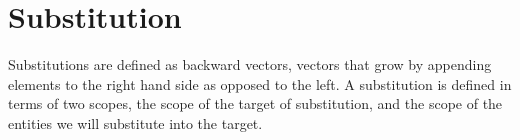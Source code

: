 \section{Substitution}




Substitutions are defined as backward vectors, vectors that grow by appending
elements to the right hand side as opposed to the left. A substitution is
defined in terms of two scopes, the scope of the target of substitution, and
the scope of the entities we will substitute into the target.

\begin{code}%
\>[0]\AgdaSpace{}%
\AgdaSymbol{:}\AgdaSpace{}%
\AgdaSpace{}%
\AgdaSpace{}%
\AgdaSpace{}%
\AgdaSpace{}%
\AgdaSpace{}%
\AgdaSpace{}%
\<%
\\
\>[0]\AgdaSpace{}%
\AgdaOperator{\AgdaFunction{⇒[}}\AgdaSpace{}%
\AgdaSpace{}%
\AgdaOperator{\AgdaFunction{]}}\AgdaSpace{}%
\AgdaSpace{}%
\AgdaSymbol{=}\AgdaSpace{}%
\AgdaSpace{}%
\AgdaSymbol{(}\AgdaSpace{}%
\AgdaSymbol{)}\AgdaSpace{}%
\<%
\end{code}

